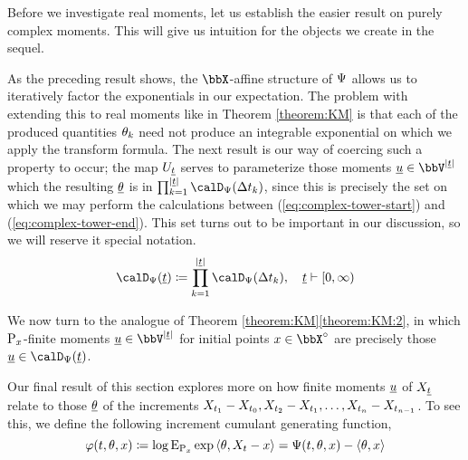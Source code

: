 

Before we investigate real moments, let us establish the easier result on purely complex moments.
This will give us intuition for the objects we create in the sequel.



As the preceding result shows, the $\stateSpace$-affine structure of $\Psi$ allows us to iteratively factor the exponentials in our expectation.
The problem with extending this to real moments like in Theorem \ref{theorem:KM} is that each of the produced quantities $\theta_k$ need not produce an integrable exponential on which we apply the transform formula.
The next result is our way of coercing such a property to occur; the map $U_{\underline t}$ serves to parameterize those moments $\underline\momentVar \in \vecSpace^{|\underline t|}$ which the resulting $\underline{\theta}$ is in $\prod_{k=1}^{|\underline t|} \momentSpace(\Delta t_k)$, since this is precisely the set on which we may perform the calculations between (\ref{eq:complex-tower-start}) and (\ref{eq:complex-tower-end}).
This set turns out to be important in our discussion, so we will reserve it special notation.
\begin{equation*}
  \momentSpace(\underline t) \defeq \prod_{k=1}^{|\underline t|} \momentSpace(\Delta t_k), \quad \underline t \vdash [0,\infty)
\end{equation*}



We now turn to the analogue of Theorem \ref{theorem:KM}\ref{theorem:KM:2}, in which ${\operatorname{P}}_x$-finite moments $\underline\momentVar \in \vecSpace^{|\underline t|}$ for initial points $\stateVar \in \stateSpace^\circ$ are precisely those $\underline\momentVar \in \momentSpace(\underline t)$.



Our final result of this section explores more on how finite moments $\underline{u}$ of $X_{\underline t}$ relate to those $\underline{\theta}$ of the increments $X_{t_1}-X_{t_0}, X_{t_2} - X_{t_1}, \ldots, X_{t_n} - X_{t_{n-1}}$.
To see this, we define the following increment cumulant generating function,
\begin{equation*}
  \varphi(t, \theta, x) \coloneqq \log{\operatorname{E}}_{{\operatorname{P}}_x}\exp{\langle \theta, X_t-x\rangle} = \Psi(t, \theta, x) - {\langle \theta , x \rangle}
\end{equation*}


